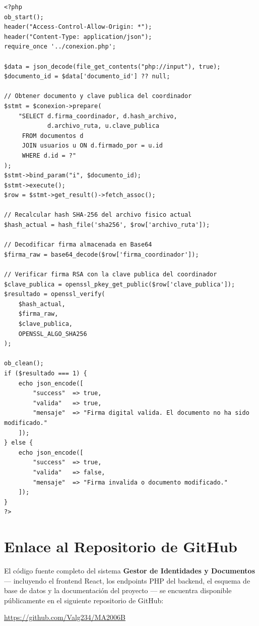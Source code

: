 \documentclass[10pt,letterpaper]{report}
\begin{document}
\begin{lstlisting}[style=phpstyle, caption={verificar\_firma\_documento.php — verificación de integridad RSA/SHA-256 (elaboración propia).}]
<?php
ob_start();
header("Access-Control-Allow-Origin: *");
header("Content-Type: application/json");
require_once '../conexion.php';

$data = json_decode(file_get_contents("php://input"), true);
$documento_id = $data['documento_id'] ?? null;

// Obtener documento y clave publica del coordinador
$stmt = $conexion->prepare(
    "SELECT d.firma_coordinador, d.hash_archivo,
            d.archivo_ruta, u.clave_publica
     FROM documentos d
     JOIN usuarios u ON d.firmado_por = u.id
     WHERE d.id = ?"
);
$stmt->bind_param("i", $documento_id);
$stmt->execute();
$row = $stmt->get_result()->fetch_assoc();

// Recalcular hash SHA-256 del archivo fisico actual
$hash_actual = hash_file('sha256', $row['archivo_ruta']);

// Decodificar firma almacenada en Base64
$firma_raw = base64_decode($row['firma_coordinador']);

// Verificar firma RSA con la clave publica del coordinador
$clave_publica = openssl_pkey_get_public($row['clave_publica']);
$resultado = openssl_verify(
    $hash_actual,
    $firma_raw,
    $clave_publica,
    OPENSSL_ALGO_SHA256
);

ob_clean();
if ($resultado === 1) {
    echo json_encode([
        "success"  => true,
        "valida"   => true,
        "mensaje"  => "Firma digital valida. El documento no ha sido modificado."
    ]);
} else {
    echo json_encode([
        "success"  => true,
        "valida"   => false,
        "mensaje"  => "Firma invalida o documento modificado."
    ]);
}
?>
\end{lstlisting}

\chapter{Enlace al Repositorio de GitHub}
\label{anx:github}

El código fuente completo del sistema \textbf{Gestor de Identidades y Documentos} — incluyendo el frontend React, los endpoints PHP del backend, el esquema de base de datos y la documentación del proyecto — se encuentra disponible públicamente en el siguiente repositorio de GitHub:

\begin{center}
  \large\url{https://github.com/Valg234/MA2006B}
\end{center}
\end{document}
